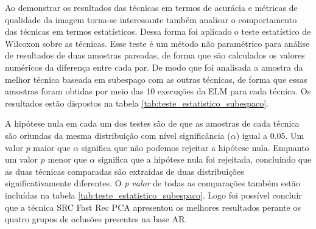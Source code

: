 Ao demonstrar os resultados das técnicas em termos de acurácia e métricas de qualidade da imagem torna-se interessante também analisar o comportamento das técnicas em termos estatísticos. Dessa forma foi aplicado o teste estatístico de Wilcoxon \cite{litchfield1949simplified} sobre as técnicas. Esse teste é um método não paramétrico para análise de resultados de duas amostras pareadas, de forma que são calculados os valores numéricos da diferença entre cada par. De modo que foi analisada a amostra da melhor técnica baseada em subespaço com as outras técnicas, de forma que essas amostras foram obtidas por meio das 10 execuções da ELM para cada técnica. Os resultados estão dispostos na tabela \ref{tab:teste_estatistico_subespaco}. 

A hipótese nula em cada um dos testes são de que as amostras de cada técnica são oriundas da mesma distribuição com nível significância ($\alpha$) igual a $0.05$. Um valor $p$ maior que $\alpha$  significa que não podemos rejeitar a hipótese nula. Enquanto um valor $p$ menor que $\alpha$ significa que a hipótese nula foi rejeitada, concluindo que as duas técnicas comparadas são extraídas de duas distribuições significativamente diferentes. O \textit{p valor} de todas as comparações também estão incluídas na tabela \ref{tab:teste_estatistico_subespaco}. Logo foi possível concluir que a técnica SRC Fast Rec PCA apresentou os melhores resultados perante os quatro grupos de oclusões presentes na base AR.


